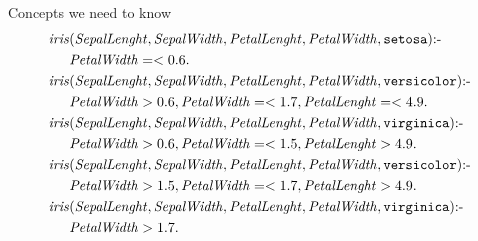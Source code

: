 \documentclass[presentation]{beamer}\mode<presentation>{\usetheme{AMSBolognaFC}}
\begin{document}
\begin{frame}[allowframebreaks]{Concepts we need to know}
    \begin{equation*}
        \begin{aligned}
            \mathit{iris}&(\mathit{SepalLenght}, \mathit{SepalWidth}, \mathit{PetalLenght}, \mathit{PetalWidth}, \mathtt{setosa})\text{:-}\\
            &\mathit{PetalWidth} =< 0.6.\\
            \mathit{iris}&(\mathit{SepalLenght}, \mathit{SepalWidth}, \mathit{PetalLenght}, \mathit{PetalWidth}, \mathtt{versicolor}) \text{:-}\\
            &\mathit{PetalWidth} > 0.6, \mathit{PetalWidth} =< 1.7, \mathit{PetalLenght} =< 4.9.\\
            \mathit{iris}&(\mathit{SepalLenght}, \mathit{SepalWidth}, \mathit{PetalLenght}, \mathit{PetalWidth}, \mathtt{virginica}) \text{:-}\\
            &\mathit{PetalWidth} > 0.6, \mathit{PetalWidth} =< 1.5, \mathit{PetalLenght} > 4.9.\\
            \mathit{iris}&(\mathit{SepalLenght}, \mathit{SepalWidth}, \mathit{PetalLenght}, \mathit{PetalWidth}, \mathtt{versicolor}) \text{:-}\\
            &\mathit{PetalWidth} > 1.5, \mathit{PetalWidth} =< 1.7, \mathit{PetalLenght} > 4.9.\\
            \mathit{iris}&(\mathit{SepalLenght}, \mathit{SepalWidth}, \mathit{PetalLenght}, \mathit{PetalWidth}, \mathtt{virginica}) \text{:-}\\
            &\mathit{PetalWidth} > 1.7.\\
        \end{aligned}
    \end{equation*}
    
    \framebreak
    
\end{frame}


\section{\longske}
\end{document}
